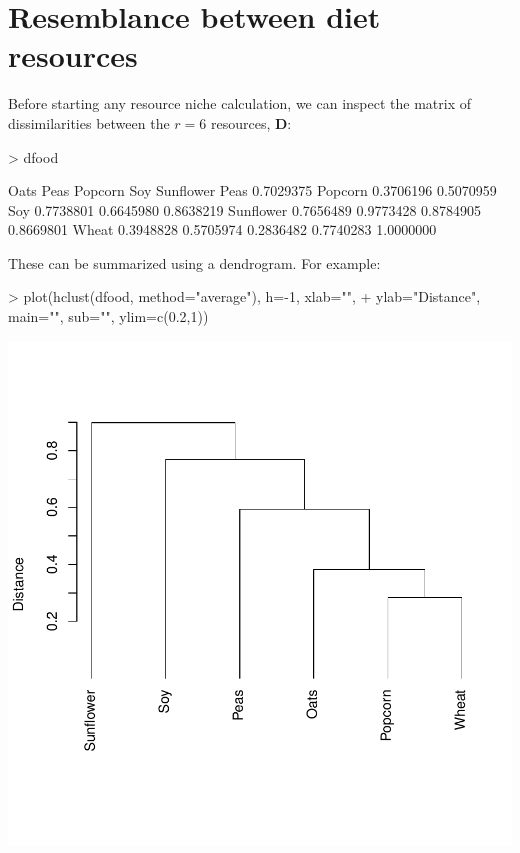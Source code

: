 \documentclass[11pt,a4paper]{article}
\begin{document}
\section{Resemblance between diet resources}
Before starting any resource niche calculation, we can inspect the matrix of dissimilarities between the $r=6$ resources, $\mathbf{D}$:
\begin{Schunk}
\begin{Sinput}
> dfood
\end{Sinput}
\begin{Soutput}
               Oats      Peas   Popcorn       Soy Sunflower
Peas      0.7029375                                        
Popcorn   0.3706196 0.5070959                              
Soy       0.7738801 0.6645980 0.8638219                    
Sunflower 0.7656489 0.9773428 0.8784905 0.8669801          
Wheat     0.3948828 0.5705974 0.2836482 0.7740283 1.0000000
\end{Soutput}
\end{Schunk}
These can be summarized using a dendrogram. For example:
\begin{Schunk}
\begin{Sinput}
> plot(hclust(dfood, method="average"), h=-1, xlab="", 
+      ylab="Distance", main="", sub="", ylim=c(0.2,1))
\end{Sinput}
\end{Schunk}
\includegraphics{PigeonExample-005}
\end{document}
